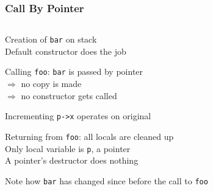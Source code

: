 \begin{frame}
  \frametitle{Call By Pointer}
  \begin{center}
    \begin{columns}
      \column{4cm}
      \column{4cm}
    \end{columns}
  \end{center}
  \vskip2mm
  \begin{overprint}
    \begin{center}
      Creation of {\tt bar} on stack \\
      Default constructor does the job
    \end{center}

    \begin{center}
      Calling {\tt foo}: {\tt bar} is passed by pointer \\
      $\Rightarrow$ no copy is made \\
      $\Rightarrow$ no constructor gets called
    \end{center}

    \begin{center}
      Incrementing {\tt p->x} operates on original
    \end{center}

    \begin{center}
      Returning from {\tt foo}: all locals are cleaned up \\
      Only local variable is {\tt p}, a pointer \\
      A pointer's destructor does nothing
    \end{center}

    \begin{center}
      Note how {\tt bar} has changed since before the call to {\tt foo}
    \end{center}
  \end{overprint}
\end{frame}



